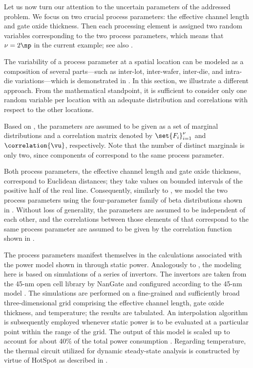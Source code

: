 Let us now turn our attention to the uncertain parameters \vu of the addressed
problem. We focus on two crucial process parameters: the effective channel
length and gate oxide thickness. Then each processing element is assigned two
random variables corresponding to the two process parameters, which means that
$\nu = 2 \np$ in the current example; see also .

\begin{remark}
The variability of a process parameter at a spatial location can be modeled as a
composition of several parts---such as inter-lot, inter-wafer, inter-die, and
intra-die variations---which is demonstrated in
. In this section, we illustrate a different
approach. From the mathematical standpoint, it is sufficient to consider only
one random variable per location with an adequate distribution and correlations
with respect to the other locations.
\end{remark}

Based on , the parameters \vu are assumed to be given as
a set of marginal distributions and a correlation matrix denoted by
$\set{F_i}_{i = 1}^\nu$ and $\correlation{\vu}$, respectively. Note that the
number of distinct marginals is only two, since \np components of \vu correspond
to the same process parameter.

Both process parameters, the effective channel length and gate oxide thickness,
correspond to Euclidean distances; they take values on bounded intervals of the
positive half of the real line. Consequently, similarly to
, we model the two process parameters using
the four-parameter family of beta distributions shown in
. Without loss of generality, the parameters are assumed
to be independent of each other, and the correlations between those elements of
\vu that correspond to the same process parameter are assumed to be given by the
correlation function shown in .

The process parameters manifest themselves in the calculations associated with
the power model shown in  through static power.
Analogously to , the modeling here is based on
 simulations of a series of  invertors. The invertors are
taken from the 45-nm open cell library by NanGate \cite{nangate} and configured
according to the 45-nm   model \cite{ptm}. The simulations are
performed on a fine-grained and sufficiently broad three-dimensional grid
comprising the effective channel length, gate oxide thickness, and temperature;
the results are tabulated. An interpolation algorithm is subsequently employed
whenever static power is to be evaluated at a particular point within the range
of the grid. The output of this model is scaled up to account for about 40\% of
the total power consumption \cite{liu2007}. Regarding temperature, the thermal
 circuit utilized for dynamic steady-state analysis is constructed by
virtue of HotSpot \cite{skadron2003} as described in .

